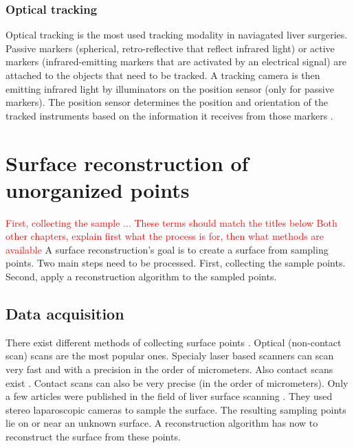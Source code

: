 \subsubsection{Optical tracking}
Optical tracking is the most used tracking modality in naviagated liver
surgeries. Passive markers (spherical, retro-reflective that reflect infrared
light) or active markers (infrared-emitting markers that are activated by an
electrical signal) \cite{wiles2004accuracy} are attached to the objects that
need to be tracked. A tracking camera is then emitting infrared light by illuminators
on the position sensor (only for passive markers). The position sensor
determines the position and orientation of the tracked instruments based on the
information it receives from those markers \cite{noauthor_polaris_nodate}.  

\section{Surface reconstruction of unorganized points}
\textcolor{red}{First, collecting the sample ... These terms should match the titles below
Both other chapters, explain first what the process is for, then what methods are available}
A surface reconstruction's goal is to create a surface from sampling points. Two
main steps need to be processed. First, collecting the sample points. Second,
apply a reconstruction algorithm to the sampled points.
\subsection{Data acquisition}
There exist different methods of collecting surface points
\cite{franca20053d}\cite{levoy2000digital}\cite{cui20113d}\cite{chu2002infrared}\cite{dou20153d}.
Optical (non-contact scan) scans are the most popular ones. Specialy laser based
scanners can scan very fast and with a precision in the order of micrometers. Also contact scans exist
\cite{pai2001scanning}. Contact scans can also be very precise (in the order of
micrometers).
Only a few articles were published in the field of liver surface scanning \cite{maier2014comparative} \cite{thompson2015accuracy}. 
They used stereo laparoscopic cameras to sample the surface.
The resulting sampling points lie on or near an unknown surface. A
reconstruction algorithm has now to reconstruct the surface from these points.
